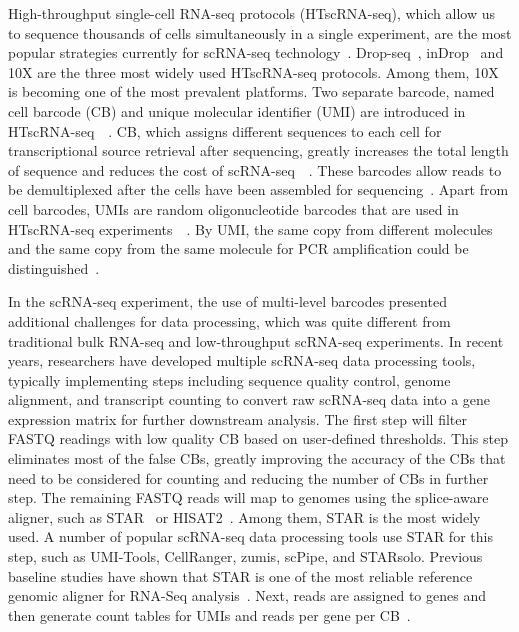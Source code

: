 \documentclass[conference]{IEEEtran}
\begin{document}
High-throughput single-cell RNA-seq protocols (HTscRNA-seq), which allow us to sequence thousands of cells simultaneously in a single experiment, are the most popular strategies currently for scRNA-seq technology~\cite{Zhang2019ComparativeAO}. Drop-seq~\cite{Macosko2015HighlyPG}, inDrop~\cite{Klein2015DropletBF} and 10X\cite{Zheng2017Massively} are the three most widely used HTscRNA-seq protocols. 
Among them, 10X is becoming one of the most prevalent platforms. 
Two separate barcode, named cell barcode (CB) and unique molecular identifier (UMI) are introduced in HTscRNA-seq~\cite{Rosenberg2018SinglecellPO}~\cite{Cao2017ComprehensiveSC}. 
CB, which assigns different sequences to each cell for transcriptional source retrieval after sequencing, greatly increases the total length of sequence and reduces the cost of scRNA-seq~\cite{Macosko2015HighlyPG}~\cite{Klein2015DropletBF}. 
These barcodes allow reads to be demultiplexed after the cells have been assembled for sequencing~\cite{Tian2018scPipe}.
Apart from cell barcodes, UMIs are random oligonucleotide barcodes that are used in HTscRNA-seq experiments~\cite{Kivioja2012Counting}~\cite{Camara2017Methods}.
By UMI, the same copy from different molecules and the same copy from the same molecule for PCR amplification could be distinguished~\cite{Smith2017UMItools}.

In the scRNA-seq experiment, the use of multi-level barcodes presented additional challenges for data processing, which was quite different from traditional bulk RNA-seq and low-throughput scRNA-seq experiments. 
In recent years, researchers have developed multiple scRNA-seq data processing tools, typically implementing steps including sequence quality control, genome alignment, and transcript counting to convert raw scRNA-seq data into a gene expression matrix for further downstream analysis. 
The first step will filter FASTQ readings with low quality CB based on user-defined thresholds. 
This step eliminates most of the false CBs, greatly improving the accuracy of the CBs that need to be considered for counting and reducing the number of CBs in further step. 
The remaining FASTQ reads will map to genomes using the splice-aware aligner, such as STAR~\cite{Dobin2013STAR} or HISAT2~\cite{Kim2015HISAT}. 
Among them, STAR is the most widely used. A number of popular scRNA-seq data processing tools use STAR for this step, such as UMI-Tools, CellRanger, zumis, scPipe, and STARsolo. 
Previous baseline studies have shown that STAR is one of the most reliable reference genomic aligner for RNA-Seq analysis~\cite{Baruzzo2017SimulationbasedCB}. 
Next, reads are assigned to genes and then generate count tables for UMIs and reads per gene per CB~\cite{Parekh2018zUMIs}. 
\end{document}
